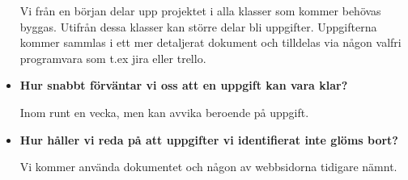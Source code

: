 \documentclass{mall}
\begin{document}
\begin{itemize}
Vi från en början delar upp projektet i alla klasser som kommer behövas byggas. Utifrån dessa klasser kan större delar bli uppgifter.
Uppgifterna kommer sammlas i ett mer detaljerat dokument och tilldelas via någon valfri programvara som t.ex jira eller trello. 

\item \textbf{Hur snabbt förväntar vi oss att en uppgift kan vara klar?}

Inom runt en vecka, men kan avvika beroende på uppgift.

\item \textbf{Hur håller vi reda på att uppgifter vi identifierat inte glöms bort?}

Vi kommer använda dokumentet och någon av webbsidorna tidigare nämnt.

\end{itemize}
\end{document}
